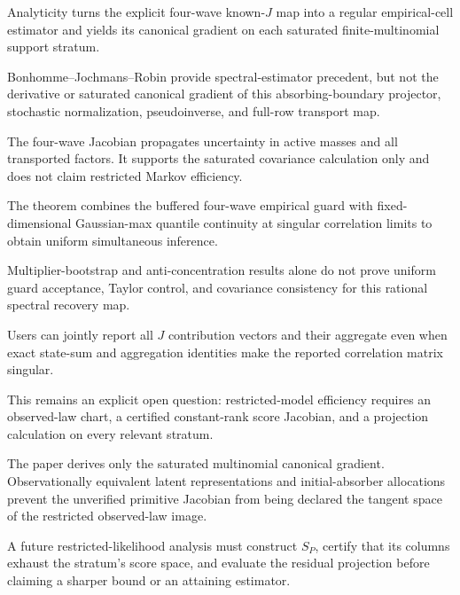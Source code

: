 Analyticity turns the explicit four-wave known-\(J\) map into a regular empirical-cell estimator and yields its canonical gradient on each saturated finite-multinomial support stratum.

Bonhomme--Jochmans--Robin provide spectral-estimator precedent, but not the derivative or saturated canonical gradient of this absorbing-boundary projector, stochastic normalization, pseudoinverse, and full-row transport map.

The four-wave Jacobian propagates uncertainty in active masses and all transported factors.  It supports the saturated covariance calculation only and does not claim restricted Markov efficiency.

The theorem combines the buffered four-wave empirical guard with fixed-dimensional Gaussian-max quantile continuity at singular correlation limits to obtain uniform simultaneous inference.

Multiplier-bootstrap and anti-concentration results alone do not prove uniform guard acceptance, Taylor control, and covariance consistency for this rational spectral recovery map.

Users can jointly report all \(J\) contribution vectors and their aggregate even when exact state-sum and aggregation identities make the reported correlation matrix singular.

This remains an explicit open question: restricted-model efficiency requires an observed-law chart, a certified constant-rank score Jacobian, and a projection calculation on every relevant stratum.

The paper derives only the saturated multinomial canonical gradient.  Observationally equivalent latent representations and initial-absorber allocations prevent the unverified primitive Jacobian from being declared the tangent space of the restricted observed-law image.

A future restricted-likelihood analysis must construct \(S_P\), certify that its columns exhaust the stratum's score space, and evaluate the residual projection before claiming a sharper bound or an attaining estimator.
